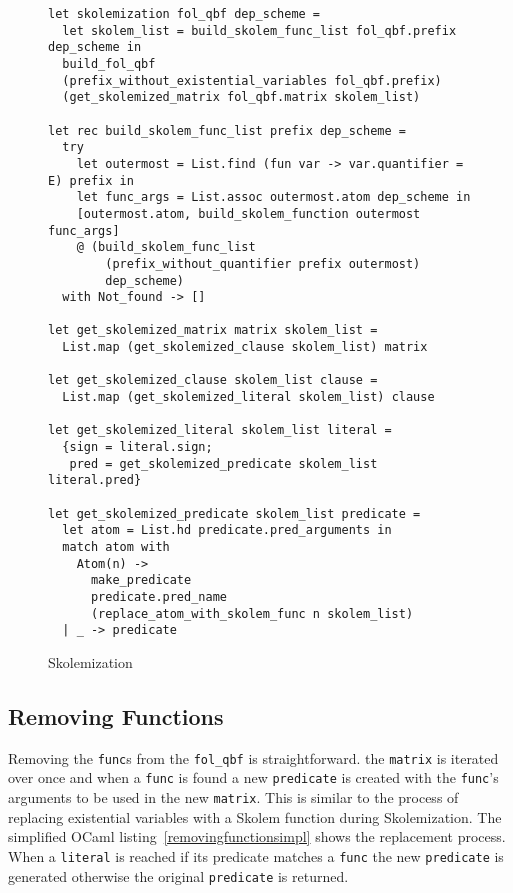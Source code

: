 \begin{figure}[h]
\caption{Skolemization}
\begin{CenteredBox}
\begin{lstlisting}[language=caml, label=skolemizationimpl]
let skolemization fol_qbf dep_scheme =
  let skolem_list = build_skolem_func_list fol_qbf.prefix dep_scheme in
  build_fol_qbf
  (prefix_without_existential_variables fol_qbf.prefix)
  (get_skolemized_matrix fol_qbf.matrix skolem_list)

let rec build_skolem_func_list prefix dep_scheme =
  try
    let outermost = List.find (fun var -> var.quantifier = E) prefix in
    let func_args = List.assoc outermost.atom dep_scheme in
    [outermost.atom, build_skolem_function outermost func_args]
    @ (build_skolem_func_list 
        (prefix_without_quantifier prefix outermost) 
        dep_scheme)
  with Not_found -> []

let get_skolemized_matrix matrix skolem_list =
  List.map (get_skolemized_clause skolem_list) matrix

let get_skolemized_clause skolem_list clause =
  List.map (get_skolemized_literal skolem_list) clause

let get_skolemized_literal skolem_list literal =
  {sign = literal.sign; 
   pred = get_skolemized_predicate skolem_list literal.pred}

let get_skolemized_predicate skolem_list predicate =
  let atom = List.hd predicate.pred_arguments in
  match atom with
    Atom(n) ->
      make_predicate
      predicate.pred_name
      (replace_atom_with_skolem_func n skolem_list)
  | _ -> predicate
\end{lstlisting}
\end{CenteredBox}
\end{figure}

\subsection{Removing Functions}
Removing the \texttt{func}s from the \texttt{fol\_qbf} is straightforward. the \texttt{matrix} is iterated over once and when a \texttt{func} is found a new \texttt{predicate} is created with the \texttt{func}'s arguments to be used in the new \texttt{matrix}. This is similar to the process of replacing existential variables with a Skolem function during Skolemization. The simplified OCaml listing~\ref{removingfunctionsimpl} shows the replacement process. When a \texttt{literal} is reached if its predicate matches a \texttt{func} the new \texttt{predicate} is generated otherwise the original \texttt{predicate} is returned.

